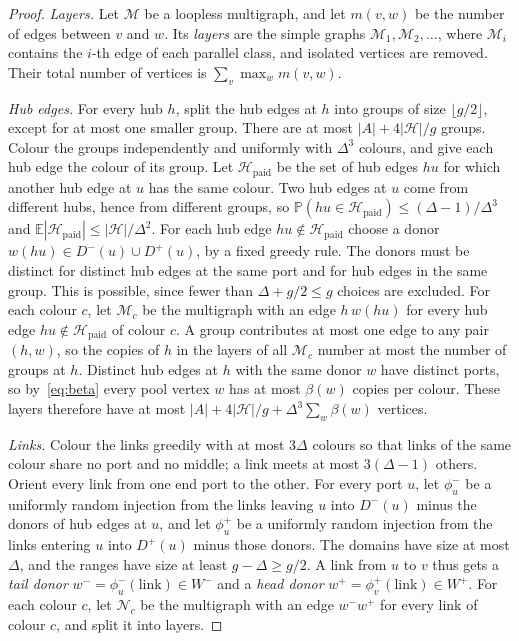 \documentclass[11pt]{article}
\theoremstyle{definition}
\theoremstyle{remark}
\numberwithin{equation}{section}
\numberwithin{figure}{section}
\numberwithin{table}{section}
\newcommand{\E}{\mathbb{E}}
\renewcommand{\Pr}{\mathbb{P}}
\newcommand{\cH}{\mathcal{H}}
\newcommand{\cM}{\mathcal{M}}
\newcommand{\cN}{\mathcal{N}}
\newcommand{\paid}{\mathrm{paid}}
\begin{document}
\begin{proof}
\emph{Layers.} Let $\cM$ be a loopless multigraph, and let $m(v,w)$ be the
number of edges between $v$ and $w$. Its \emph{layers} are the simple graphs
$\cM_1,\cM_2,\dots$, where $\cM_i$ contains the $i$-th edge of each parallel
class, and isolated vertices are removed. Their total number of vertices is
$\sum_v\max_wm(v,w)$.

\emph{Hub edges.} For every hub $h$, split the hub edges at $h$ into groups of
size $\lfloor g/2\rfloor$, except for at most one smaller group. There are at
most $|A|+4|\cH|/g$ groups. Colour the groups independently and uniformly with
$\Delta^3$ colours, and give each hub edge the colour of its group. Let
$\cH_\paid$ be the set of hub edges $hu$ for which another hub edge at $u$ has
the same colour. Two hub edges at $u$ come from different hubs, hence from
different groups, so $\Pr(hu\in\cH_\paid)\le(\Delta-1)/\Delta^3$ and
$\E|\cH_\paid|\le|\cH|/\Delta^2$. For each hub edge
$hu\notin\cH_\paid$ choose a donor $w(hu)\in D^-(u)\cup D^+(u)$, by a fixed
greedy rule. The donors must be distinct for distinct hub edges at the same
port and for hub edges in the same group. This is possible, since fewer than
$\Delta+g/2\le g$ choices are excluded. For each colour $c$, let
$\cM_c$ be the multigraph with an edge $h\,w(hu)$ for every hub edge
$hu\notin\cH_\paid$ of colour $c$. A group contributes at most one edge to
any pair $(h,w)$, so the copies of $h$ in the layers of all $\cM_c$ number
at most the number of groups at $h$. Distinct hub edges at $h$ with the same
donor $w$ have distinct ports, so by~\eqref{eq:beta} every pool vertex $w$ has
at most $\beta(w)$ copies per colour. These layers therefore have at most
$|A|+4|\cH|/g+\Delta^3\sum_w\beta(w)$ vertices.

\emph{Links.} Colour the links greedily with at most $3\Delta$ colours so that
links of the same colour share no port and no middle; a link meets at most
$3(\Delta-1)$ others. Orient every link from one end port to the other. For
every port $u$, let $\phi^-_u$ be a uniformly random injection from the links
leaving $u$ into $D^-(u)$ minus the donors of hub edges at $u$, and let
$\phi^+_u$ be a uniformly random injection from the links entering $u$ into
$D^+(u)$ minus those donors. The domains have size at most $\Delta$, and the
ranges have size at least $g-\Delta\ge g/2$. A link from $u$ to $v$ thus gets
a \emph{tail donor} $w^-=\phi_u^-(\text{link})\in W^-$ and a \emph{head
donor} $w^+=\phi_v^+(\text{link})\in W^+$. For each colour $c$, let
$\cN_c$ be the multigraph with an edge $w^-w^+$ for every link of colour
$c$, and split it into layers.


\end{proof}
\end{document}
